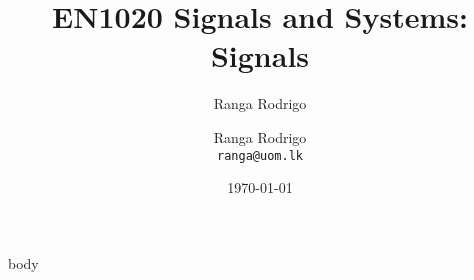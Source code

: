 \documentclass[t, aspectratio=169,xcolor={svgnames}, 10pt]{beamer}
\title{EN1020 Signals and Systems: Signals}
\author{Ranga Rodrigo}
\author[]{Ranga Rodrigo\\ \texttt{ranga@uom.lk}}
\institute[]{The University of Moratuwa, Sri Lanka}
\date{\today}
\begin{document}
    \begin{frame}
        \titlepage
    \end{frame}



    {body}















\end{document}
